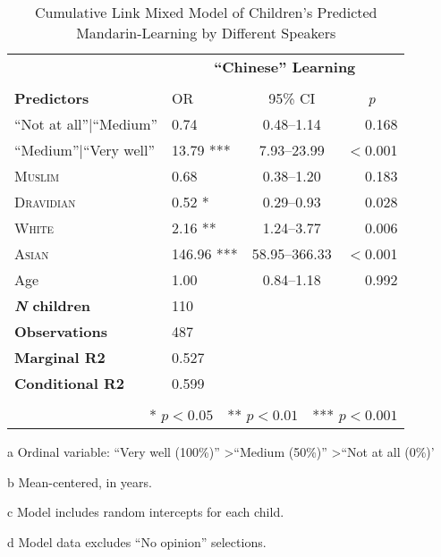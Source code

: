\begin{table*}[t]
\small
\caption{Cumulative Link Mixed Model of Children's Predicted Mandarin-Learning by Different Speakers}\label{tab:mandarin-ord}
    \centering
    \vspace{5pt}
\begin{threeparttable}
\begin{tabular}{llcr}
 \toprule
& \multicolumn{3}{c}{\textbf{``Chinese'' Learning}\tnote{a}} \\
\cline{2-4} \\[-.75em]
\textbf{Predictors} & {OR} & {95\% CI} & \multicolumn{1}{c}{\textit{p}} \\ 
\midrule
  \hline
``Not at all''$|$``Medium'' & 0.74 & 0.48--1.14 & 0.168 \\ 
``Medium''$|$``Very well'' & 13.79 *** & 7.93--23.99 & $<$0.001 \\ 
  \textsc{Muslim} & 0.68 & 0.38--1.20 & 0.183 \\ 
  \textsc{Dravidian} & 0.52 * & 0.29--0.93 & 0.028 \\ 
  \textsc{White} & 2.16 ** & 1.24--3.77 & 0.006 \\ 
  \textsc{Asian} & 146.96 *** & 58.95--366.33 & $<$0.001 \\ 
Age\tnote{b} & 1.00 & 0.84--1.18 & 0.992 \\ 
\midrule
\bfseries{\textit{N} children}\tnote{c} & 110 &  &  \\ 
\textbf{Observations}\tnote{d} & 487 &  &  \\ 
 \textbf{Marginal R2} & 0.527 &  &  \\ 
 \textbf{Conditional R2} & 0.599 &&\\
\bottomrule\\[-.75em]
\multicolumn{4}{r}{* $p<0.05$~~** $p<0.01$~~*** $p<0.001$}\\
\end{tabular}
\begin{tablenotes}[flushleft]
    \item[a] Ordinal variable: ``Very well (100\%)'' \textgreater ``Medium (50\%)'' \textgreater ``Not at all (0\%)'
    \item[b] Mean-centered, in years.
    \item[c] Model includes random intercepts for each child.
    \item[d] Model data excludes ``No opinion'' selections. 
\end{tablenotes}
\end{threeparttable}
\end{table*}